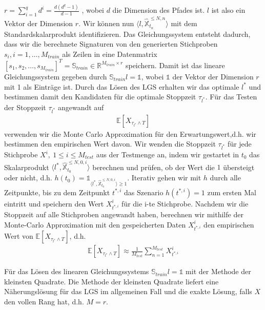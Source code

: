\documentclass[12pt,titlepage,headsepline]{article}
\begin{document}
      $r=\sum_{i=1}^q d^i = \frac{d(d^q-1)}{d-1}$ \cite{iisig}, wobei $d$ die Dimension des Pfades ist. $l$ ist also ein Vektor der Dimension $r$. Wir können nun $\langle l,\hat{\mathbb{X}}_{t_n}^{\leq N,n}\rangle$ mit dem Standardskalarprodukt identifizieren. Das Gleichungssystem entsteht dadurch, dass wir die berechnete Signaturen von den generierten Stichproben $s_i, i = 1,\ldots,M_{train}$ als Zeilen in eine Datenmatrix $[s_1,s_2,\ldots,s_{M_{train}}]^T=\mathbb{S}_{train} \in \mathbb{R}^{M_{train} \times r}$
      speichern. Damit ist das lineare Gleichungssystem gegeben durch $\mathbb{S}_{train}l = \mathds{1}$, wobei $\mathds{1}$ der Vektor der Dimension $r$ mit 1 als Einträge ist. Durch das Lösen des LGS erhalten wir das optimale $l^*$ und bestimmen damit den Kandidaten für die optimale Stoppzeit $\tau_{l^*}$.
      \hfill\break
      Für das Testen der Stoppzeit $\tau_{l^*}$ angewandt auf
      \begin{align*}
        \mathbb{E}[X_{\tau_{l^*} \land T}]
      \end{align*}
      verwenden wir die Monte Carlo Approximation für den Erwartungswert,d.h. wir bestimmen den empirischen Wert davon. Wir wenden die Stoppzeit $\tau_{l^*}$ für jede Stichprobe $X^i, \ 1 \leq i \leq M_{test}$ aus der Testmenge an, indem wir gestartet in $t_0$ das Skalarprodukt $\langle l^*,\hat{\mathbb{X}}_{t_0}^{\leq N,0,i}\rangle$ berechnen und prüfen, ob der Wert die $1$ übersteigt oder nicht, d.h. $h(t_0)=\mathds{1}_{\langle l^*,\hat{\mathbb{X}}_{t_0}^{\leq N,0,i}\rangle \geq 1}$. Iterativ gehen wir mit $h$ durch alle Zeitpunkte, bis zu dem Zeitpunkt $t^{*,i}$ das Szenario $h(t^{*,i})=1$ zum ersten Mal eintritt und speichern den Wert $X^i_{t^{*,i}}$ für die i-te Stichprobe.
      Nachdem wir die Stoppzeit auf alle Stichproben angewandt haben, berechnen wir mithilfe der Monte-Carlo Approximation mit den gespeicherten Daten $X^i_{t^{*,i}}$ den empirischen Wert von $\mathbb{E}[X_{\tau_{l^*} \land T}]$, d.h.
      \begin{align*}
        \mathbb{E}[X_{\tau_{l^*} \land T}] \approx \frac{1}{M_{test}} \sum_{n=1}^{M_{test}}X^i_{t^{*,i}}
      \end{align*}

      \hfill\break
      Für das Lösen des linearen Gleichungssystems $\mathbb{S}_{train}l = \mathds{1}$ mit der Methode der kleinsten Quadrate. Die Methode der kleinsten Quadrate liefert eine Näherungslösung für das LGS im allgemeinen Fall und die exakte Lösung, falls $X$ den vollen Rang hat, d.h. $M=r$.
\end{document}

